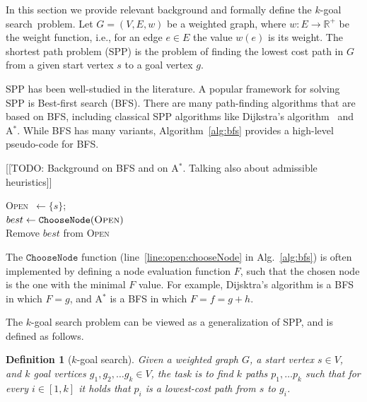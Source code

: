 \documentclass{aicom2e}
\newtheorem{definition}{Definition}
\newcommand{\kgs}{$k$-goal search}
\newcommand{\astar}{A$^*$}
\newcommand{\open}{\textsc{Open}}
\begin{document}
In this section we provide relevant background and formally define the \kgs\ problem. 
Let $G=(V,E,w)$ be a weighted graph, where $w:E\rightarrow \mathbb{R}^+$ be the weight function, i.e., for an edge $e\in E$ the value $w(e)$ is its weight. 
The shortest path problem (SPP) is the problem of finding the lowest cost path in $G$ from a given start vertex $s$ to a goal vertex $g$. 

SPP has been well-studied in the literature. A popular framework for solving SPP is Best-first search (BFS). There are many path-finding algorithms that are based on BFS, including classical SPP algorithms like Dijkstra's algorithm~\cite{} and \astar{}. 
    While BFS has many variants, Algorithm~\ref{alg:bfs} provides a high-level pseudo-code for BFS. 


[[TODO: Background on BFS and on \astar{}. Talking also about admissible heuristics]]


\begin{algorithm2e}[t!]
    \open{}~$\gets\{s\}$; \\
    \While {\open{} $\neq \emptyset$} {
        $best \gets \texttt{ChooseNode}(\open{})$ \\
        Remove $best$ from \open{}\\
        \For{$n \in neighbors(best)$}{
            Add $n$ to \open{}\\
        }
    } 
\caption{Best-first-search}
\label{alg:bfs}
\end{algorithm2e}




The $\texttt{ChooseNode}$ function (line~\ref{line:open:chooseNode} in Alg.~\ref{alg:bfs}) is often implemented by defining a node evaluation function $F$, such that 
the chosen node is the one with the minimal $F$ value. For example, Dijsktra's algorithm is a BFS in which $F=g$, and \astar{} is a BFS in which $F=f=g+h$. 




The $k$-goal search problem can be viewed as a generalization of SPP, and is defined as follows. 

\begin{definition}[$k$-goal search]
Given a weighted graph $G$, a start vertex $s\in V$, and $k$ goal vertices 
$g_1, g_2,\ldots g_k\in V$, the task is to find $k$ paths $p_1,\ldots p_k$ 
such that for every $i\in [1,k]$ it holds that $p_i$ is a lowest-cost path from $s$ to $g_i$. 
\end{definition}
\end{document}
